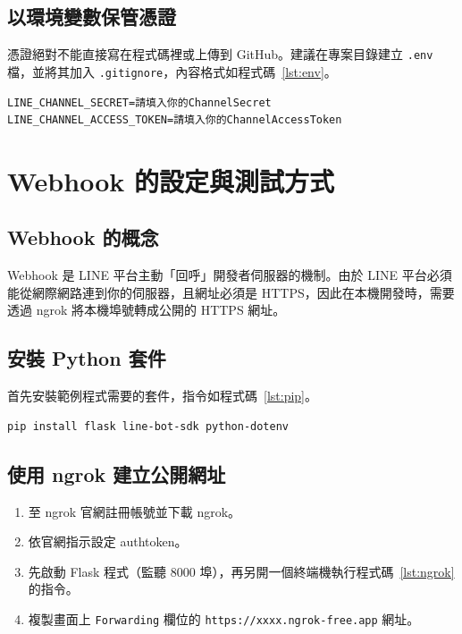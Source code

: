 \documentclass[12pt,a4paper]{report}
\begin{document}
\section{以環境變數保管憑證}
憑證絕對不能直接寫在程式碼裡或上傳到 GitHub。建議在專案目錄建立 \texttt{.env} 檔，並將其加入 \texttt{.gitignore}，內容格式如程式碼~\ref{lst:env}。

\begin{lstlisting}[caption={.env 環境變數設定範例}, label={lst:env}]
LINE_CHANNEL_SECRET=請填入你的ChannelSecret
LINE_CHANNEL_ACCESS_TOKEN=請填入你的ChannelAccessToken
\end{lstlisting}

\chapter{Webhook 的設定與測試方式}

\section{Webhook 的概念}
Webhook 是 LINE 平台主動「回呼」開發者伺服器的機制。由於 LINE 平台必須能從網際網路連到你的伺服器，且網址必須是 HTTPS，因此在本機開發時，需要透過 ngrok 將本機埠號轉成公開的 HTTPS 網址。

\section{安裝 Python 套件}
首先安裝範例程式需要的套件，指令如程式碼~\ref{lst:pip}。

\begin{lstlisting}[language=bash, caption={安裝所需 Python 套件}, label={lst:pip}]
pip install flask line-bot-sdk python-dotenv
\end{lstlisting}

\section{使用 ngrok 建立公開網址}
\begin{enumerate}[label=步驟 \arabic*：, leftmargin=*]
  \item 至 ngrok 官網註冊帳號並下載 ngrok。
  \item 依官網指示設定 authtoken。
  \item 先啟動 Flask 程式（監聽 8000 埠），再另開一個終端機執行程式碼~\ref{lst:ngrok} 的指令。
  \item 複製畫面上 \texttt{Forwarding} 欄位的 \texttt{https://xxxx.ngrok-free.app} 網址。
\end{enumerate}
\end{document}
